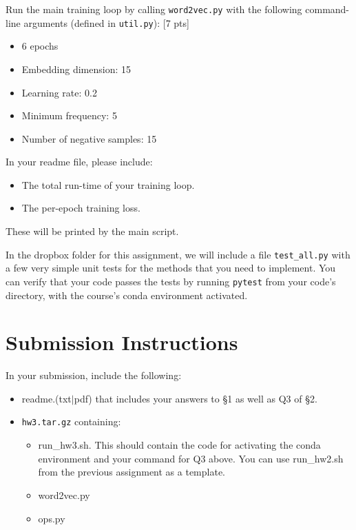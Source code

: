 \documentclass[11pt]{article}
\begin{document}
\vspace{2em}
 Run the main training loop by calling \texttt{word2vec.py} with the following command-line arguments (defined in \texttt{util.py}): [7 pts]
\begin{itemize}
  \item 6 epochs
  \item Embedding dimension: 15
  \item Learning rate: 0.2
  \item Minimum frequency: 5
  \item Number of negative samples: 15
\end{itemize}
In your readme file, please include: 
\begin{itemize}
  \item The total run-time of your training loop.  
  \item The per-epoch training loss. 
\end{itemize}
These will be printed by the main script.


\vspace{2em}
 In the dropbox folder for this assignment, we will include a file \texttt{test\_all.py} with a few very simple unit tests for the methods that you need to implement.  You can verify that your code passes the tests by running \texttt{pytest} from your code's directory, with the course's conda environment activated.


\section*{Submission Instructions}

In your submission, include the following:
\begin{itemize}
  \item readme.(txt$\mid$pdf) that includes your answers to \S1 as well as Q3 of \S2. 
  \item \texttt{hw3.tar.gz} containing:
  \begin{itemize}
    \item run\_hw3.sh.  This should contain the code for activating the conda environment and your command for Q3 above.  You can use run\_hw2.sh from the previous assignment as a template.
    \item word2vec.py
    \item ops.py
  \end{itemize}
\end{itemize}
\end{document}
